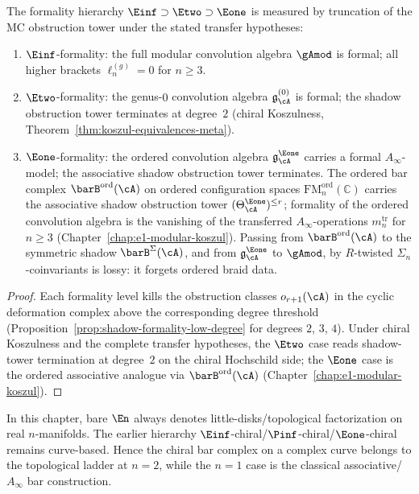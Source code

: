 \begin{proposition}
\label{prop:en-formality-mc-truncation}
\ClaimStatusConditional
The formality hierarchy $\Einf \supset \Etwo \supset \Eone$ is measured by truncation of the MC obstruction tower under the stated transfer hypotheses:
\begin{enumerate}[label=\textup{(\roman*)}]
\item $\Einf$-formality: the full modular convolution algebra $\gAmod$ is formal; all higher brackets $\ell_n^{(g)} = 0$ for $n \geq 3$.
\item $\Etwo$-formality: the genus-$0$ convolution algebra $\mathfrak{g}^{(0)}_\cA$ is formal; the shadow obstruction tower terminates at degree~$2$ (chiral Koszulness, Theorem~\ref{thm:koszul-equivalences-meta}).
\item $\Eone$-formality: the ordered convolution algebra $\mathfrak{g}^{\Eone}_\cA$ carries a formal $A_\infty$-model; the associative shadow obstruction tower terminates.
 The ordered bar complex $\barB^{\mathrm{ord}}(\cA)$ on ordered configuration spaces $\mathrm{FM}^{\mathrm{ord}}_n(\mathbb{C})$ carries the associative shadow obstruction tower $(\Theta^{\Eone}_\cA)^{\leq r}$; formality of the ordered convolution algebra is the vanishing of the transferred $A_\infty$-operations $m_n^{\mathrm{tr}}$ for $n \geq 3$ (Chapter~\ref{chap:e1-modular-koszul}). Passing from $\barB^{\mathrm{ord}}(\cA)$ to the symmetric shadow $\barB^{\Sigma}(\cA)$, and from $\mathfrak{g}^{\Eone}_\cA$ to $\gAmod$, by $R$-twisted $\Sigma_n$-coinvariants is lossy: it forgets ordered braid data.
\end{enumerate}
\end{proposition}

\begin{proof}
Each formality level kills the obstruction classes $o_{r+1}(\cA)$ in the cyclic deformation complex above the corresponding degree threshold (Proposition~\ref{prop:shadow-formality-low-degree} for degrees $2$, $3$, $4$).
Under chiral Koszulness and the complete transfer hypotheses, the $\Etwo$ case reads shadow-tower termination at degree~$2$ on the chiral Hochschild side; the $\Eone$ case is the ordered associative analogue via $\barB^{\mathrm{ord}}(\cA)$ (Chapter~\ref{chap:e1-modular-koszul}).
\end{proof}

\begin{convention}
\label{conv:en-two-axes}
In this chapter, bare $\En$ always denotes little-disks/topological
factorization on real $n$-manifolds. The earlier hierarchy
$\Einf$-chiral/$\Pinf$-chiral/$\Eone$-chiral remains curve-based.
Hence the chiral bar complex on a complex curve belongs to the
topological ladder at $n = 2$, while the $n = 1$ case is the
classical associative/$A_\infty$ bar construction.
\end{convention}


